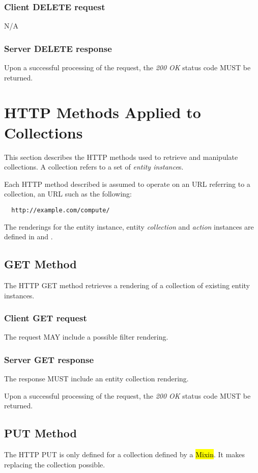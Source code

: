 \documentclass[10pt,a4paper]{article}
\begin{document}
\subsubsection*{Client DELETE request}
N/A

\subsubsection*{Server DELETE response}
Upon a successful processing of the request, the \emph{200 OK} status code MUST be returned.

\section{HTTP Methods Applied to Collections}
\label{sec:http_methods_coll}

This section describes the HTTP methods used to retrieve and manipulate
collections. A collection refers to a set of {\em entity instance}s.

Each HTTP method described is assumed to operate
on an URL referring to a collection, an URL such as the following:
\begin{verbatim}
  http://example.com/compute/
\end{verbatim}

The renderings for the entity instance, entity {\em collection} and {\em action}
instances are defined in \cite{occi:text} and \cite{occi:json}.

\subsection{GET Method}
The HTTP GET method retrieves a rendering of a collection of existing entity instances.

\subsubsection*{Client GET request}
The request MAY include a possible filter rendering.

\subsubsection*{Server GET response}
The response MUST include an entity collection rendering.

Upon a successful processing of the request, the \emph{200 OK} status code MUST be returned.

\subsection{PUT Method}
The HTTP PUT is only defined for a collection defined by a \hl{Mixin}. It makes replacing the collection possible.
\end{document}

